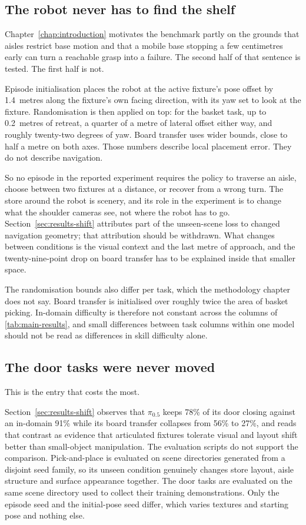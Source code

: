 \subsection*{The robot never has to find the shelf}

Chapter~\ref{chap:introduction} motivates the benchmark partly on the grounds that aisles restrict base motion and that a mobile base stopping a few centimetres early can turn a reachable grasp into a failure. The second half of that sentence is tested. The first half is not.

Episode initialisation places the robot at the active fixture's pose offset by 1.4~metres along the fixture's own facing direction, with its yaw set to look at the fixture. Randomisation is then applied on top: for the basket task, up to 0.2~metres of retreat, a quarter of a metre of lateral offset either way, and roughly twenty-two degrees of yaw. Board transfer uses wider bounds, close to half a metre on both axes. Those numbers describe local placement error. They do not describe navigation.

So no episode in the reported experiment requires the policy to traverse an aisle, choose between two fixtures at a distance, or recover from a wrong turn. The store around the robot is scenery, and its role in the experiment is to change what the shoulder cameras see, not where the robot has to go. Section~\ref{sec:results-shift} attributes part of the unseen-scene loss to changed navigation geometry; that attribution should be withdrawn. What changes between conditions is the visual context and the last metre of approach, and the twenty-nine-point drop on board transfer has to be explained inside that smaller space.

The randomisation bounds also differ per task, which the methodology chapter does not say. Board transfer is initialised over roughly twice the area of basket picking. In-domain difficulty is therefore not constant across the columns of \ref{tab:main-results}, and small differences between task columns within one model should not be read as differences in skill difficulty alone.

\subsection*{The door tasks were never moved}

This is the entry that costs the most.

Section~\ref{sec:results-shift} observes that $\pi_{0.5}$ keeps 78\% of its door closing against an in-domain 91\% while its board transfer collapses from 56\% to 27\%, and reads that contrast as evidence that articulated fixtures tolerate visual and layout shift better than small-object manipulation. The evaluation scripts do not support the comparison. Pick-and-place is evaluated on scene directories generated from a disjoint seed family, so its unseen condition genuinely changes store layout, aisle structure and surface appearance together. The door tasks are evaluated on the same scene directory used to collect their training demonstrations. Only the episode seed and the initial-pose seed differ, which varies textures and starting pose and nothing else.

